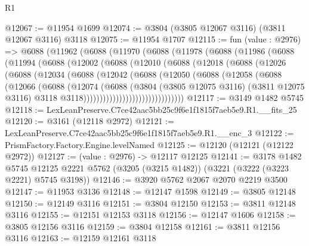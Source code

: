 \begin{lexlean}{R1}
\begin{coremodule}
@12067 := @11954 @1699
@12074 := @3804 (@3805 @12067 @3116) (@3811 @12067 @3116) @3118
@12075 := @11954 @1707
@12115 := fun (value : @2976) =>
  @6088
    (@11962
      (@6088
        (@11970
          (@6088
            (@11978
              (@6088
                (@11986
                  (@6088
                    (@11994
                      (@6088
                        (@12002
                          (@6088
                            (@12010
                              (@6088
                                (@12018
                                  (@6088
                                    (@12026
                                      (@6088
                                        (@12034
                                          (@6088
                                            (@12042
                                              (@6088
                                                (@12050
                                                  (@6088
                                                    (@12058
                                                      (@6088
                                                        (@12066
                                                          (@6088
                                                            (@12074
                                                              (@6088
                                                                (@3804
                                                                  (@3805 @12075 @3116)
                                                                  (@3811 @12075 @3116)
                                                                  @3118
                                                                  @3118)))))))))))))))))))))))))))))))
@12117 := @3149 @1482 @5745
@12118 := LexLeanPreserve.C7ce42aac5bb25c9f6e1f1815f7aeb5e9.R1.__fits_25
@12120 := @3161 (@12118 @2972)
@12121 := LexLeanPreserve.C7ce42aac5bb25c9f6e1f1815f7aeb5e9.R1.__enc_3
@12122 := PrismFactory.Factory.Engine.levelNamed
@12125 := @12120 (@12121 (@12122 @2972))
@12127 := (value : @2976) -> @12117 @12125
@12141 := @3178
    @1482
    @5745
    @12125
    @2221
    @5762
    (@3205 (@3215 @1482))
    (@3221 (@3222 (@3223 @2221) @5745 @3198))
@12146 := @3920 @5762 @2067 @2070 @2219 @3500
@12147 := @11953 @3136
@12148 := @12147 @1598
@12149 := @3805 @12148
@12150 := @12149 @3116
@12151 := @3804 @12150
@12153 := @3811 @12148 @3116
@12155 := @12151 @12153 @3118
@12156 := @12147 @1606
@12158 := @3805 @12156 @3116
@12159 := @3804 @12158
@12161 := @3811 @12156 @3116
@12163 := @12159 @12161 @3118

\end{coremodule}
\end{lexlean}
